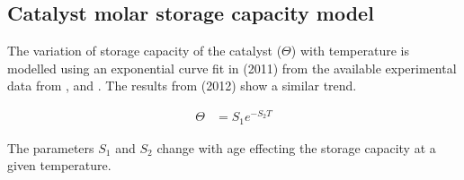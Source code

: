 \subsection{Catalyst molar storage capacity model}
The variation of storage capacity of the catalyst ($\Theta$) with temperature is
modelled using an exponential curve fit in \cite{hsieh2011development} (2011)
from the available experimental data from
\cite{willems2007closed}, \cite{ciardelli2004scr} and \cite{joo2008study}.  The
results from \cite{schmieg2012thermal} (2012) show a similar trend.

\begin{align*}
    \Theta &= S_1 e^{-S_2 T}
\end{align*}

The parameters $S_1$ and $S_2$ change with age effecting the storage capacity at
a given temperature.

